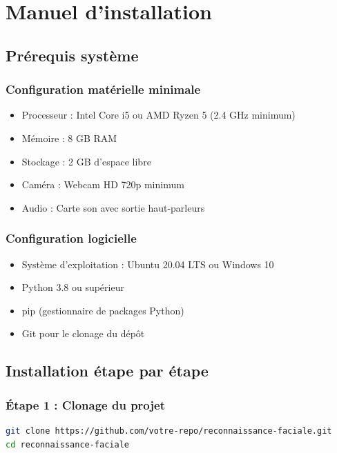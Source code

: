 \documentclass[12pt,a4paper]{article}
\begin{document}
\newpage

\section{Manuel d'installation}

\subsection{Prérequis système}

\subsubsection{Configuration matérielle minimale}

\begin{itemize}
\item Processeur : Intel Core i5 ou AMD Ryzen 5 (2.4 GHz minimum)
\item Mémoire : 8 GB RAM
\item Stockage : 2 GB d'espace libre
\item Caméra : Webcam HD 720p minimum
\item Audio : Carte son avec sortie haut-parleurs
\end{itemize}

\subsubsection{Configuration logicielle}

\begin{itemize}
\item Système d'exploitation : Ubuntu 20.04 LTS ou Windows 10
\item Python 3.8 ou supérieur
\item pip (gestionnaire de packages Python)
\item Git pour le clonage du dépôt
\end{itemize}

\subsection{Installation étape par étape}

\subsubsection{Étape 1 : Clonage du projet}

\begin{lstlisting}[language=bash, caption=Clonage du dépôt]
git clone https://github.com/votre-repo/reconnaissance-faciale.git
cd reconnaissance-faciale
\end{lstlisting}
\end{document}
